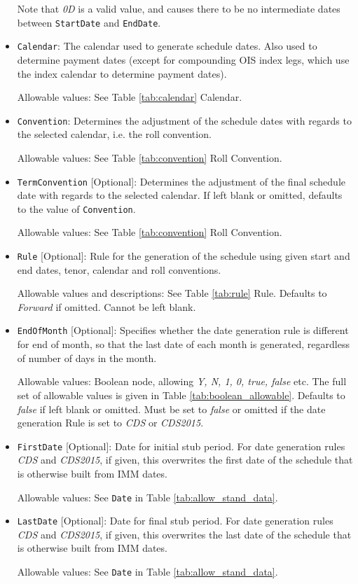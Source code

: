 \begin{itemize}
Note that \emph{0D} is a valid value, and causes there to be no intermediate dates between \lstinline!StartDate! and \lstinline!EndDate!.

\item \lstinline!Calendar!: The calendar used to generate schedule  dates. Also used to determine payment dates (except for compounding OIS index legs, which use the index calendar to determine payment dates).

Allowable values: See Table \ref{tab:calendar} Calendar.

\item \lstinline!Convention!: Determines the adjustment of the schedule dates with
  regards to the selected calendar, i.e. the roll convention. 

Allowable values: See Table \ref{tab:convention} Roll Convention.

\item \lstinline!TermConvention! [Optional]: Determines the adjustment of the final schedule
  date with regards to the selected calendar. If left blank or omitted, defaults to the value of \lstinline!Convention!.

Allowable values: See Table \ref{tab:convention} Roll Convention.

\item \lstinline!Rule! [Optional]: Rule for the generation of the schedule using given
  start and end dates, tenor, calendar and roll conventions. 

Allowable values and descriptions: See Table \ref{tab:rule} Rule. Defaults to \emph{Forward} if omitted. Cannot be left blank.

\item \lstinline!EndOfMonth! [Optional]: Specifies whether the date generation rule is different for end of month, so that the last date of each month is generated, regardless of number of days in the month.

Allowable values: Boolean node, allowing \emph{Y, N, 1, 0, true, false} etc. The full set of allowable values is given in Table \ref{tab:boolean_allowable}. Defaults to \emph{false} if left blank or omitted. Must be set to \emph{false} or omitted if the date generation Rule is set to \emph{CDS} or \emph{CDS2015}.

\item \lstinline!FirstDate! [Optional]: Date for initial stub period. For date generation rules \emph{CDS} and \emph{CDS2015}, if given, this
  overwrites the first date of the schedule that is otherwise built from IMM dates.

Allowable values: See \lstinline!Date! in Table \ref{tab:allow_stand_data}.

\item \lstinline!LastDate! [Optional]: Date for final stub period. For date generation rules \emph{CDS} and \emph{CDS2015}, if given, this
  overwrites the last date of the schedule that is otherwise built from IMM dates.

Allowable values: See \lstinline!Date! in Table \ref{tab:allow_stand_data}.
\end{itemize}

